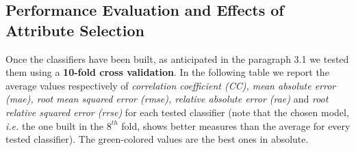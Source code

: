 \subsection{Performance Evaluation and Effects of Attribute Selection}
Once the classifiers have been built, as anticipated in the paragraph 3.1 we tested them using a \textbf{10-fold cross validation}. 
In the following table we report the average values respectively of \textit{correlation coefficient (CC), mean absolute error (mae), root mean squared error (rmse), relative absolute error (rae)} and \textit{root relative squared error (rrse)} for each tested classifier (note that the chosen model, \textit{i.e.} the one built in the $8^{th}$ fold, shows better measures than the average for every tested classifier).
The green-colored values are the best ones in absolute.


\begingroup
\setlength{\tabcolsep}{6pt} %
\renewcommand{\arraystretch}{1.5} %

